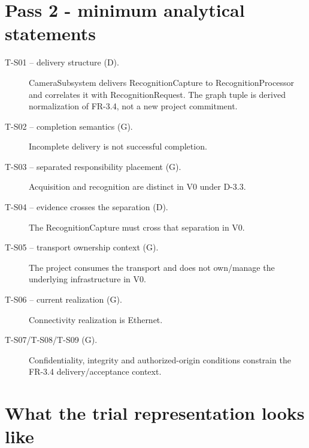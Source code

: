 \documentclass[10pt,a4paper]{article}
\begin{document}
\section{Pass 2 - minimum analytical statements}
\begin{description}
\item[T-S01 -- delivery structure (D).] CameraSubsystem delivers RecognitionCapture to RecognitionProcessor and correlates it with RecognitionRequest. The graph tuple is derived normalization of FR-3.4, not a new project commitment.
\item[T-S02 -- completion semantics (G).] Incomplete delivery is not successful completion.
\item[T-S03 -- separated responsibility placement (G).] Acquisition and recognition are distinct in V0 under D-3.3.
\item[T-S04 -- evidence crosses the separation (D).] The RecognitionCapture must cross that separation in V0.
\item[T-S05 -- transport ownership context (G).] The project consumes the transport and does not own/manage the underlying infrastructure in V0.
\item[T-S06 -- current realization (G).] Connectivity realization is Ethernet.
\item[T-S07/T-S08/T-S09 (G).] Confidentiality, integrity and authorized-origin conditions constrain the FR-3.4 delivery/acceptance context.
\end{description}

\section{What the trial representation looks like}
\begin{center}
\end{center}
\end{document}
